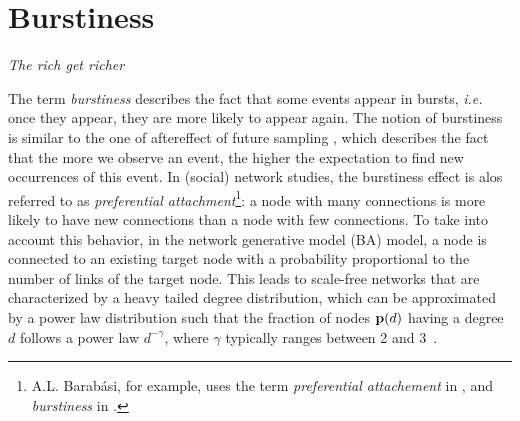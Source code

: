 \section{Burstiness}
\label{sec:burstiness}
\vspace{-0.2cm}
\begin{center} \emph{The rich get richer} \end{center}

\vspace{0.1cm}

The term \textit{burstiness} describes the fact that some events appear in bursts, \textit{i.e.} once they appear, they are more likely to appear again. The notion of burstiness is similar to the one of aftereffect of future sampling \cite{feller_68}, which describes the fact that the more we observe an event, the higher the expectation to find new occurrences of this event. In (social) network studies, the burstiness effect is alos referred to as \textit{preferential attachment}\footnote{A.L. Barab\'asi, for example, uses the term \textit{preferential attachement} in \cite{barabasi1999emergence}, and \textit{burstiness} in \cite{barabasi_burst}.}: a node with many connections is more likely to have new connections than a node with few connections. To take into account this behavior, in the network generative model  (BA) \cite{albert2002statistical} model, a node is connected to an existing target node with a probability proportional to the number of links of the target node. This leads to scale-free networks that are characterized by a heavy tailed degree distribution, which can be approximated by a power law distribution such that the fraction of nodes $\mathbf{p}(d)$ having a degree $d$ follows a power law $d^{-\gamma}$, where $\gamma$ typically ranges between 2 and 3~\cite{barabasi1999emergence}. 

